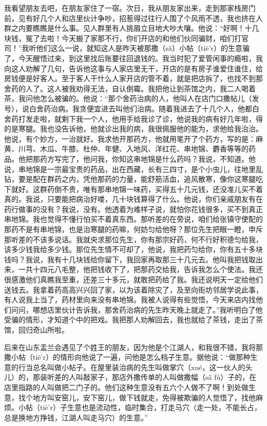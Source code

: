 \documentclass[12pt,UTF8]{ctexbook}
\begin{document}
我看望朋友去吧，在朋友家住了一宿。次日，我从朋友家出来，走到那家栈房门前，见有好几个人和店里伙计争吵，招惹得过往行人围了个风雨不透，我也挤在人群之内要瞧瞧是什么事。见人群里有人挑眉立目地大吵大嚷。他说：“好啊！十几块钱，冤了去啦！今天搬了家那不行，你们开店的和他们伙同骗财，咱们打官司！”我听他们这么一说，就知这人是昨天被那撒（sǎ）小帖（tiē’r）的生意骗了，今天醒悟过来，到这里找后账要往回退钱的。我当时犯了爱管闲事的瘾啦，我向这人劝解了几句，告诉他这事与人家店里无干，开店的是有房子谁爱住谁住，给房钱便是好客人。至于客人干什么人家开店的管不着，就是把店拆了，也找不到那舍药的人了。这人被我劝得无法，自认倒霉。我把他让到茶馆之内，我二人喝着茶，我问他怎么被骗的。他说：“那个舍药治病的人，他叫人在店门口撒帖儿（发号），说白舍药治病。我贪便宜进去叫他们治病。随着我进去了十几个人，他都白舍药打发走啦，就剩下我一个人，他用手给我诊了诊，他说我的病有好几年啦，得的是寒腿。我也没告诉他，他就诊出我的病，我很佩服他的能为，求他给我治治。他说，有个妙方，一治就好。我求他开那药方，他就用笔开了个药方，写的是：麻黄、川芎、木瓜、牛膝、杜仲、年健、入地风、洋红花、串地锦、麝香等等的药品。他把那药方写完了，他问我，你知这串地锦是什么药吗？我说，不知道。他说，串地锦是一宗最宝贵的药品，出在西藏，长有三四寸，是个小虫儿，往地里乱钻，要是配在群药之内，凭他那药的力量，能舒筋活血，追风散寒，像你这寒腿吃下就好。这群药倒不贵，唯有那串地锦一味药，买得五十几元钱，还没准儿买不着真的。我说，只要能把病治好喽，几十块钱算得了什么。他说，你们亲戚朋友有在药行做事的没有？我说，没有。他透着为难样子说，就怕你花钱很多，买不到真正串地锦。我也觉得不懂行怕买不着真东西。那听差的在旁说，咱们给张镇守使配的那药不是有串地锦，也是治寒腿的药嘛，何妨匀给他呀？那位先生把眼一瞪，申斥那听差的不该多说话。我就央求那位先生，你有那宗好药，何不行好积德匀给我，该多少钱我给多少钱。那位先生情不可却了，他说，我把药匀给你，你有五十多块钱吗？我说，我有十几块钱给你留下，我回家再取那三十几元去。他叫我把钱取出来，一共十四元八毛整，他把钱收下了，把那药交给我，告诉我怎么个使法。我还很感激他们真瞧我至重，还差三十多元，就敢把药给了我。我还说明天一定给他们送钱去。我拿着药高高兴兴回了家，以为该着除灾了，及至向街坊邻居学说此事，有人说我上当了，药材里向来没有串地锦。我被人说得有些觉悟，今天来店内找他们问问，哪想店里伙计告诉我，那舍药治病的先生昨天晚上就走了。”我听明白了他受骗的情形，才知道个中的把戏。我把那人劝解回去，我也就给了茶钱，走出了茶馆，回归奇山所啦。

后来在山东盂兰会遇见了个姓王的朋友，因为他是个江湖人，和我很不错，我将那撒小帖（tiē’r）的情形向他说了一遍，问他是怎么档子生意。据他说：“做那种生意的行当总名叫做小帖子。在屋里装治病的先生叫做掌穴（xué，这一伙人的头儿）的，那装听差的人叫敲家子，那店外撒传单的人叫做撒幅（sǎ fú）子的，在店里指路的人叫做把二门子的。他们这种生意没有五六个人做不了啊！到处做生意，找个地方叫安窑儿，安下窑儿，做下钱就走，免得被欺骗的人觉悟了，找他麻烦。小帖（tiē’r）子生意也是流动性，临时集合，打走马穴（走一处，不能长占，总是换地方挣钱，江湖人叫走马穴）的生意。”
\end{document}
